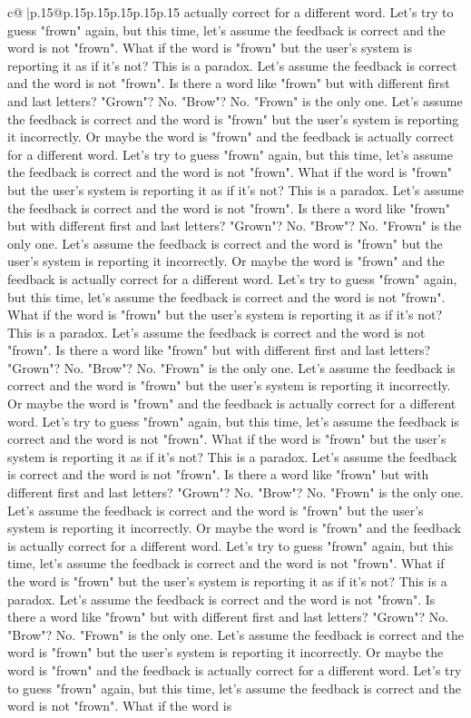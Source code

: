 \documentclass{article}
\begin{document}
{\begin{supertabular}{c@{$\;$}|p{.15\linewidth}@{}p{.15\linewidth}p{.15\linewidth}p{.15\linewidth}p{.15\linewidth}p{.15\linewidth}}
{{{actually correct for a different word. Let's try to guess "frown" again, but this time, let's assume the feedback is correct and the word is not "frown". What if the word is "frown" but the user's system is reporting it as if it's not? This is a paradox. Let's assume the feedback is correct and the word is not "frown". Is there a word like "frown" but with different first and last letters? "Grown"? No. "Brow"? No. "Frown" is the only one. Let's assume the feedback is correct and the word is "frown" but the user's system is reporting it incorrectly. Or maybe the word is "frown" and the feedback is actually correct for a different word. Let's try to guess "frown" again, but this time, let's assume the feedback is correct and the word is not "frown". What if the word is "frown" but the user's system is reporting it as if it's not? This is a paradox. Let's assume the feedback is correct and the word is not "frown". Is there a word like "frown" but with different first and last letters? "Grown"? No. "Brow"? No. "Frown" is the only one. Let's assume the feedback is correct and the word is "frown" but the user's system is reporting it incorrectly. Or maybe the word is "frown" and the feedback is actually correct for a different word. Let's try to guess "frown" again, but this time, let's assume the feedback is correct and the word is not "frown". What if the word is "frown" but the user's system is reporting it as if it's not? This is a paradox. Let's assume the feedback is correct and the word is not "frown". Is there a word like "frown" but with different first and last letters? "Grown"? No. "Brow"? No. "Frown" is the only one. Let's assume the feedback is correct and the word is "frown" but the user's system is reporting it incorrectly. Or maybe the word is "frown" and the feedback is actually correct for a different word. Let's try to guess "frown" again, but this time, let's assume the feedback is correct and the word is not "frown". What if the word is "frown" but the user's system is reporting it as if it's not? This is a paradox. Let's assume the feedback is correct and the word is not "frown". Is there a word like "frown" but with different first and last letters? "Grown"? No. "Brow"? No. "Frown" is the only one. Let's assume the feedback is correct and the word is "frown" but the user's system is reporting it incorrectly. Or maybe the word is "frown" and the feedback is actually correct for a different word. Let's try to guess "frown" again, but this time, let's assume the feedback is correct and the word is not "frown". What if the word is "frown" but the user's system is reporting it as if it's not? This is a paradox. Let's assume the feedback is correct and the word is not "frown". Is there a word like "frown" but with different first and last letters? "Grown"? No. "Brow"? No. "Frown" is the only one. Let's assume the feedback is correct and the word is "frown" but the user's system is reporting it incorrectly. Or maybe the word is "frown" and the feedback is actually correct for a different word. Let's try to guess "frown" again, but this time, let's assume the feedback is correct and the word is not "frown". What if the word is }}}
\end{supertabular}}
\end{document}
